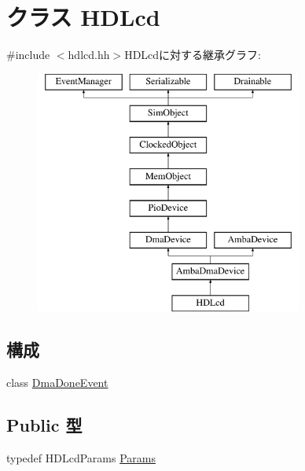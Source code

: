 \hypertarget{classHDLcd}{
\section{クラス HDLcd}
\label{classHDLcd}
}


{\ttfamily \#include $<$hdlcd.hh$>$}HDLcdに対する継承グラフ:\begin{figure}[H]
\begin{center}
\leavevmode
\includegraphics[height=8cm]{classHDLcd}
\end{center}
\end{figure}
\subsection*{構成}
\begin{DoxyCompactItemize}
\item 
class \hyperlink{classHDLcd_1_1DmaDoneEvent}{DmaDoneEvent}
\end{DoxyCompactItemize}
\subsection*{Public 型}
\begin{DoxyCompactItemize}
\item 
typedef HDLcdParams \hyperlink{classHDLcd_a31ccb03af3b5962a67bed42eca6ce2f0}{Params}
\end{DoxyCompactItemize}
